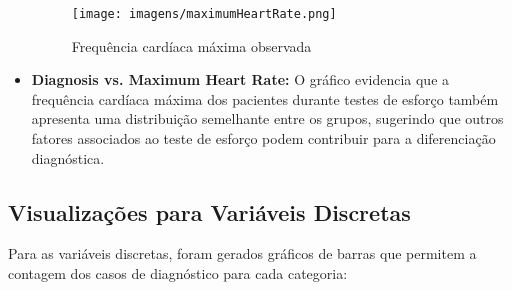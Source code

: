 \documentclass[conference]{IEEEtran}
\begin{document}
\begin{itemize}
    \begin{figure}[htbp]
        \centering
        \texttt{[image: imagens/maximumHeartRate.png]}
        \caption{Frequência cardíaca máxima observada}
        \label{freq_card_max}
    \end{figure}
    \item \textbf{Diagnosis vs. Maximum Heart Rate:} O gráfico evidencia que a frequência cardíaca máxima dos pacientes durante testes de esforço também apresenta uma distribuição semelhante entre os grupos, sugerindo que outros fatores associados ao teste de esforço podem contribuir para a diferenciação diagnóstica.
\end{itemize}

\subsection{Visualizações para Variáveis Discretas}
Para as variáveis discretas, foram gerados gráficos de barras que permitem a contagem dos casos de diagnóstico para cada categoria:
\end{document}
